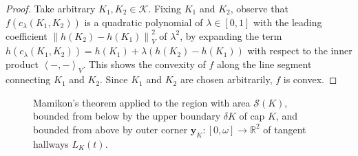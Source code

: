 \begin{proof}
Take arbitrary \(K_1, K_2 \in \mathcal{K}\). Fixing \(K_1\) and \(K_2\), observe that \(f(c_\lambda(K_1, K_2))\) is a quadratic polynomial of \(\lambda \in [0, 1]\) with the leading coefficient \(\left\lVert h(K_2) - h(K_1) \right\rVert_V^2\) of \(\lambda^2\), by expanding the term \(h(c_\lambda(K_1, K_2)) = h(K_1) + \lambda (h(K_2) - h(K_1))\) with respect to the inner product \(\left< -, - \right>_V\). This shows the convexity of \(f\) along the line segment connecting \(K_1\) and \(K_2\). Since \(K_1\) and \(K_2\) are chosen arbitrarily, \(f\) is convex.
\end{proof}

\begin{figure}
\centering

\caption{Mamikon’s theorem applied to the region with area \(\mathcal{S}(K)\), bounded from below by the upper boundary \(\delta K\) of cap \(K\), and bounded from above by outer corner \(\mathbf{y}_K : [0, \omega] \to \mathbb{R}^2\) of tangent hallways \(L_K(t)\).}
\label{fig:mamikon-sofa}
\end{figure}


